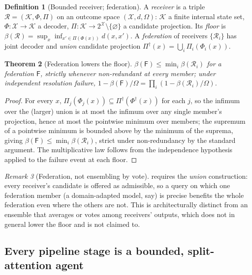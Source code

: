 \documentclass[11pt,twocolumn,a4paper]{article}
\theoremstyle{frathm}
\newtheorem{theorem}{Theorem}[section]
\theoremstyle{definition}
\newtheorem{definition}[theorem]{Definition}
\theoremstyle{remark}
\newtheorem{remark}[theorem]{Remark}
\newcommand{\flo}{\beta}
\newcommand{\Om}{\Omega}
\newcommand{\Rec}{\mathcal{R}}
\newcommand{\Know}{\mathcal{K}}
\newcommand{\Cands}{\mathcal{X}}
\newcommand{\Fed}{\mathsf{F}}
\begin{document}
\begin{definition}[Bounded receiver; federation]
\label{def:bounded-receiver}
A \emph{receiver} is a triple $\Rec=(\Know,\Phi,\Pi)$ on an outcome space
$(\Cands,d,\Om)$: $\Know$ a finite internal state set, $\Phi:\Cands\to
\Know$ a decoder, $\Pi:\Know\to2^{\Cands}\setminus\{\varnothing\}$ a
candidate projection. Its \emph{floor} is $\flo(\Rec)=\sup_x\inf_{x'\in
\Pi(\Phi(x))}d(x,x')$. A \emph{federation} of receivers
$\{\Rec_i\}$ has joint decoder and \emph{union} candidate projection
$\Pi^{\dagger}(x)=\bigcup_i\Pi_i(\Phi_i(x))$.
\end{definition}

\begin{theorem}[Federation lowers the floor]
\label{thm:federation}
$\flo(\Fed)\le\min_i\flo(\Rec_i)$ for a federation $\Fed$, strictly
whenever non-redundant at every member; under independent resolution
failure, $1-\flo(\Fed)/\Om=\prod_i(1-\flo(\Rec_i)/\Om)$.
\end{theorem}

\begin{proof}
For every $x$, $\Pi_j(\Phi_j(x))\subseteq\Pi^{\dagger}(\Phi^{\dagger}(x))$
for each $j$, so the infimum over the (larger) union is at most the
infimum over any single member's projection, hence at most the pointwise
minimum over members; the supremum of a pointwise minimum is bounded above
by the minimum of the suprema, giving $\flo(\Fed)\le\min_i\flo(\Rec_i)$,
strict under non-redundancy by the standard argument. The multiplicative
law follows from the independence hypothesis applied to the failure event
at each floor.
\end{proof}

\begin{remark}[Federation, not ensembling by vote]
\label{rem:federation-not-vote}
 requires the \emph{union} construction: every
receiver's candidate is offered as admissible, so a query on which one
federation member (a domain-adapted model, say) is precise benefits the
whole federation even where the others are not. This is architecturally
distinct from an ensemble that averages or votes among receivers'
outputs, which does not in general lower the floor and is not claimed to.
\end{remark}

\subsection{Every pipeline stage is a bounded, split-attention agent}
\end{document}
